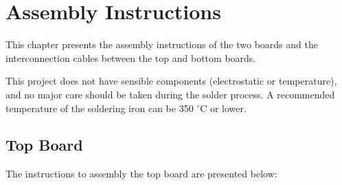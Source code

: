 %
%
%
%
%

%
%
%
%
%
%

\chapter{Assembly Instructions} \label{ch:assembly}

This chapter presents the assembly instructions of the two boards and the interconnection cables between the top and bottom boards.

This project does not have sensible components (electrostatic or temperature), and no major care should be taken during the solder process. A recommended temperature of the soldering iron can be 350 $^{\circ}$C or lower.

\section{Top Board}

The instructions to assembly the top board are presented below:

